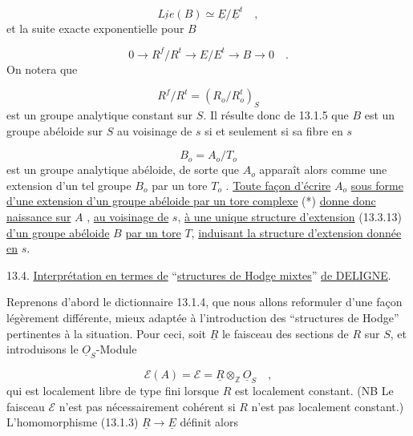 \begin{equation}\tag{13.3.14}
\underline{Lie}(B) \simeq \underline{E}/\underline{E}^{t} \quad ,
\end{equation}
et la suite exacte exponentielle pour $B$



\begin{equation}\tag{13.3.15}
0 \longrightarrow R^f/R^t \longrightarrow E/E^t \longrightarrow B \longrightarrow 0 \quad .
\end{equation}
On notera que

\begin{equation}\tag{13.3.16}
R^f/R^t = (R_o/R_o^t)_S
\end{equation}
est un groupe analytique constant sur $S$. Il résulte donc de 13.1.5 que $B$ est un groupe abéloide sur $S$ au voisinage de $s$ si et seulement si sa fibre en $s$

\begin{equation*}
B_o = A_o/T_o
\end{equation*}
est un groupe analytique abéloide, de sorte que $A_o$ apparaît alors comme une extension d'un tel groupe $B_o$ par un tore $T_o$ . \underline{Toute façon d'écrire} $A_o$ \underline{sous forme d'une extension d'un groupe abéloide par un tore complexe} (*) \underline{donne donc naissance sur} $A$ , \underline{au voisinage de} $s$, \underline{à une unique structure d'extension} (13.3.13) \underline{d'un groupe abéloide} $B$ \underline{par un tore} $T$, \underline{induisant la structure d'extension donnée en} $s$.


13.4. \underline{Interprétation en termes de} ``\underline{structures de Hodge mixtes}'' \underline{de DELIGNE}.

Reprenons d'abord le dictionnaire 13.1.4, que nous allons reformuler d'une façon légèrement différente, mieux adaptée à l'introduction des ``structures de Hodge'' pertinentes à la situation. Pour ceci, soit $\underline{R}$ le faisceau des sections de $R$ sur $S$, et introduisons le $\underline{O}_S$-Module

\begin{equation}\tag{13.4.1}
\mathcal{E}(A) = \mathcal{E} = \underline{R} \otimes_{\mathbb{Z}} \underline{O}_S \quad ,
\end{equation}
qui est localement libre de type fini lorsque $R$ est localement constant. (NB Le faisceau $\mathcal{E}$ n'est pas nécessairement cohérent si $R$ n'est pas localement constant.) L'homomorphisme (13.1.3) $\underline{R} \longrightarrow \underline{E}$ définit alors


